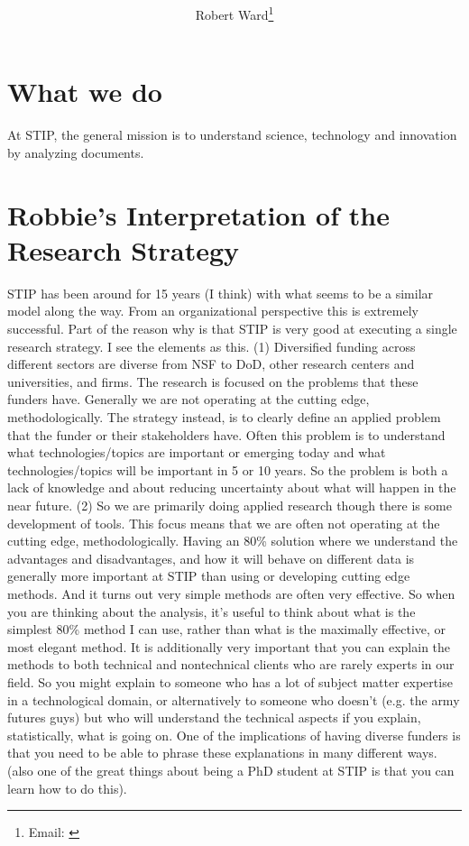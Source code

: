 \documentclass[12pt,letterpaper]{article} %
\begin{document}
\title{\textbf{\papertitle}}
\author[]{Robert Ward\footnote{Email: \href{mailto:\myemail}{\myemail}}}
\affil[]{\myaffiliation}


\maketitle\thispagestyle{empty}

\section{What we do}
At STIP, the general mission is to understand science, technology and innovation by analyzing documents.





\section{Robbie's Interpretation of the Research Strategy}
STIP has been around for 15 years (I think) with what seems to be a similar model along the way.  From an organizational perspective this is extremely successful.  Part of the reason why is that STIP is very good at executing a single research strategy.  I see the elements as this.  (1) Diversified funding across different sectors are diverse from NSF to DoD, other research centers and universities, and firms.  The research is focused on the problems that these funders have.  Generally we are not operating at the cutting edge, methodologically.  The strategy instead, is to clearly define an applied problem that the funder or their stakeholders have.  Often this problem is to understand what technologies/topics are important or emerging today and what technologies/topics will be important in 5 or 10 years.  So the problem is both a lack of knowledge and about reducing uncertainty about what will happen in the near future.  (2) So we are primarily doing applied research though there is some development of tools.  This focus means that we are often not operating at the cutting edge, methodologically.  Having an 80\% solution where we understand the advantages and disadvantages, and how it will behave on different data is generally more important at STIP than using or developing cutting edge methods.  And it turns out very simple methods are often very effective.  So when you are thinking about the analysis, it's useful to think about what is the simplest 80\% method I can use, rather than what is the maximally effective, or most elegant method.  It is additionally very important that you can explain the methods to both technical and nontechnical clients who are rarely experts in our field.  So you might explain to someone who has a lot of subject matter expertise in a technological domain, or alternatively to someone who doesn't (e.g. the army futures guys) but who will understand the technical aspects if you explain, statistically, what is going on.  One of the implications of having diverse funders is that you need to be able to phrase these explanations in many different ways.  (also one of the great things about being a PhD student at STIP is that you can learn how to do this).
\end{document}
